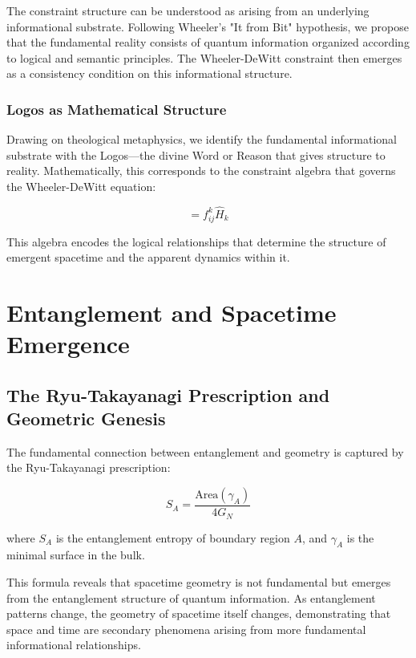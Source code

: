 \documentclass[12pt,a4paper]{article}
\newcommand{\op}[1]{\hat{#1}}
\begin{document}
The constraint structure can be understood as arising from an underlying informational substrate. Following Wheeler's "It from Bit" hypothesis, we propose that the fundamental reality consists of quantum information organized according to logical and semantic principles. The Wheeler-DeWitt constraint then emerges as a consistency condition on this informational structure.

\subsubsection{Logos as Mathematical Structure}

Drawing on theological metaphysics, we identify the fundamental informational substrate with the Logos—the divine Word or Reason that gives structure to reality. Mathematically, this corresponds to the constraint algebra that governs the Wheeler-DeWitt equation:

\begin{equation}
    [\op{H}_i, \op{H}_j] = f_{ij}^k \op{H}_k
\end{equation}

This algebra encodes the logical relationships that determine the structure of emergent spacetime and the apparent dynamics within it.

\section{Entanglement and Spacetime Emergence}

\subsection{The Ryu-Takayanagi Prescription and Geometric Genesis}

The fundamental connection between entanglement and geometry is captured by the Ryu-Takayanagi prescription:

\begin{equation}
    S_A = \frac{\text{Area}(\gamma_A)}{4G_N}
\end{equation}

where $S_A$ is the entanglement entropy of boundary region $A$, and $\gamma_A$ is the minimal surface in the bulk.

This formula reveals that spacetime geometry is not fundamental but emerges from the entanglement structure of quantum information. As entanglement patterns change, the geometry of spacetime itself changes, demonstrating that space and time are secondary phenomena arising from more fundamental informational relationships.
\end{document}
